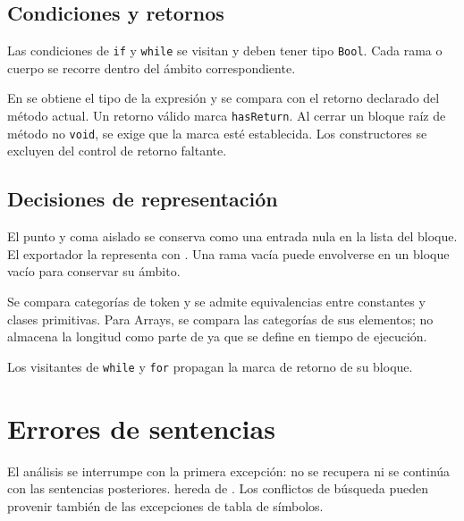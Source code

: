 \subsection{Condiciones y retornos}
Las condiciones de \texttt{if} y \texttt{while} se visitan y deben
tener tipo \texttt{Bool}. Cada rama o cuerpo se recorre dentro del
ámbito correspondiente.

En  se obtiene el tipo de la expresión y
se compara con el retorno declarado del método actual. Un retorno válido
marca \texttt{hasReturn}. Al cerrar un bloque raíz de método no \texttt{void},
se exige que la marca esté establecida. Los constructores se excluyen
del control de retorno faltante.

\subsection{Decisiones de representación}
\label{sec:limites-sentencias}
\begin{description}[style=nextline]
  \item[Sentencias vacías]
  El punto y coma aislado se conserva como una entrada nula en la lista
  del bloque. El exportador la representa con
  . Una rama vacía puede
  envolverse en un bloque vacío para conservar su ámbito.
  \item[Compatibilidad de tipos]
  Se compara categorías de token y se admite
  equivalencias entre constantes y clases primitivas. Para Arrays, se
  compara las categorías de sus elementos; no almacena la longitud
  como parte de  ya que se define en tiempo de ejecución.
  \item[Retorno dentro de ciclos]
  Los visitantes de \texttt{while} y \texttt{for} propagan la marca
  de retorno de su bloque. 
\end{description}

\section{Errores de sentencias}
\label{sec:errores-sentencias}
El análisis se interrumpe con la primera excepción: no se recupera ni se
continúa con las sentencias posteriores.  hereda
de . Los conflictos de búsqueda pueden
provenir también de las excepciones de tabla de símbolos.

